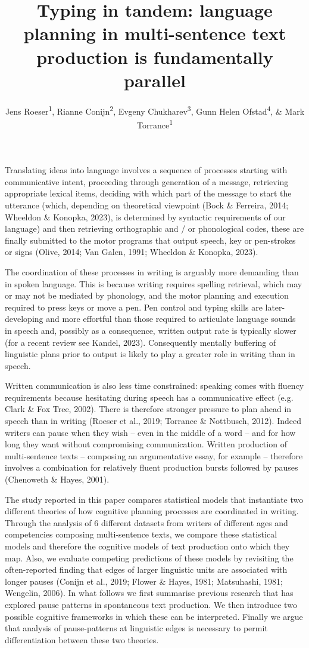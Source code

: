 \documentclass[
  man,floatsintext]{apa7}
\title{Typing in tandem: language planning in multi-sentence text production is fundamentally parallel}
\author{Jens Roeser\textsuperscript{1}, Rianne Conijn\textsuperscript{2}, Evgeny Chukharev\textsuperscript{3}, Gunn Helen Ofstad\textsuperscript{4}, \& Mark Torrance\textsuperscript{1}}
\date{}
\affiliation{\vspace{0.5cm}\textsuperscript{1} Department of Psychology, Nottingham Trent University, United Kingdom\\\textsuperscript{2} Human-Technology Interaction Group, Eindhoven University of Technology, The Netherlands\\\textsuperscript{3} Department of English, Iowa State University, Iowa\\\textsuperscript{4} Educational Sciences and Humanities, University of Stavanger, Norway}
\begin{document}
\maketitle

Translating ideas into language involves a sequence of processes starting with communicative intent, proceeding through generation of a message, retrieving appropriate lexical items, deciding with which part of the message to start the utterance (which, depending on theoretical viewpoint (Bock \& Ferreira, 2014; Wheeldon \& Konopka, 2023), is determined by syntactic requirements of our language) and then retrieving orthographic and / or phonological codes, these are finally submitted to the motor programs that output speech, key or pen-strokes or signs (Olive, 2014; Van Galen, 1991; Wheeldon \& Konopka, 2023).

The coordination of these processes in writing is arguably more demanding than in spoken language. This is because writing requires spelling retrieval, which may or may not be mediated by phonology, and the motor planning and execution required to press keys or move a pen. Pen control and typing skills are later-developing and more effortful than those required to articulate language sounds in speech and, possibly as a consequence, written output rate is typically slower (for a recent review see Kandel, 2023). Consequently mentally buffering of linguistic plans prior to output is likely to play a greater role in writing than in speech.

Written communication is also less time constrained: speaking comes with fluency requirements because hesitating during speech has a communicative effect (e.g. Clark \& Fox Tree, 2002). There is therefore stronger pressure to plan ahead in speech than in writing (Roeser et al., 2019; Torrance \& Nottbusch, 2012). Indeed writers can pause when they wish -- even in the middle of a word -- and for how long they want without compromising communication. Written production of multi-sentence texts -- composing an argumentative essay, for example -- therefore involves a combination for relatively fluent production bursts followed by pauses (Chenoweth \& Hayes, 2001).

The study reported in this paper compares statistical models that instantiate two different theories of how cognitive planning processes are coordinated in writing. Through the analysis of 6 different datasets from writers of different ages and competencies composing multi-sentence texts, we compare these statistical models and therefore the cognitive models of text production onto which they map. Also, we evaluate competing predictions of these models by revisiting the often-reported finding that edges of larger linguistic units are associated with longer pauses (Conijn et al., 2019; Flower \& Hayes, 1981; Matsuhashi, 1981; Wengelin, 2006). In what follows we first summarise previous research that has explored pause patterns in spontaneous text production. We then introduce two possible cognitive frameworks in which these can be interpreted. Finally we argue that analysis of pause-patterns at linguistic edges is necessary to permit differentiation between these two theories.
\end{document}
